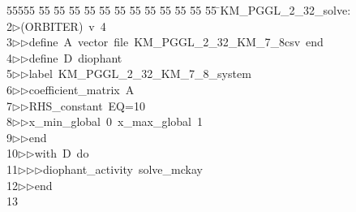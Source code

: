 %
%
\begin{tabbing}
55555 \= 55 \= 55 \= 55 \= 55 \= 55 \= 55 \= 55 \= 55 \= 55 \= 55 \= 55 \= 55 \= \>KM\_PGGL\_2\_32\_solve:\\[0pt]
2\>$\triangleright$\>(ORBITER)\ v\ 4\ \\[0pt]
3\>$\triangleright$\>$\triangleright$\>define\ A\ vector\ file\ KM\_PGGL\_2\_32\_KM\_7\_8csv\ end\ \\[0pt]
4\>$\triangleright$\>$\triangleright$\>define\ D\ diophant\ \\[0pt]
5\>$\triangleright$\>$\triangleright$\>label\ KM\_PGGL\_2\_32\_KM\_7\_8\_system\ \\[0pt]
6\>$\triangleright$\>$\triangleright$\>coefficient\_matrix\ A\ \\[0pt]
7\>$\triangleright$\>$\triangleright$\>RHS\_constant\ EQ=10\ \\[0pt]
8\>$\triangleright$\>$\triangleright$\>x\_min\_global\ 0\ x\_max\_global\ 1\ \\[0pt]
9\>$\triangleright$\>$\triangleright$\>end\ \\[0pt]
10\>$\triangleright$\>$\triangleright$\>with\ D\ do\ \\[0pt]
11\>$\triangleright$\>$\triangleright$\>$\triangleright$\>diophant\_activity\ solve\_mckay\ \\[0pt]
12\>$\triangleright$\>$\triangleright$\>end\\[0pt]
13\>\end{tabbing}
